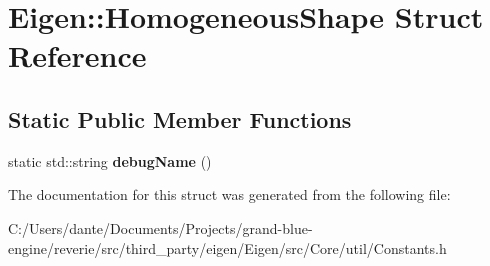 \hypertarget{struct_eigen_1_1_homogeneous_shape}{}\section{Eigen\+::Homogeneous\+Shape Struct Reference}
\label{struct_eigen_1_1_homogeneous_shape}
\subsection*{Static Public Member Functions}
\begin{DoxyCompactItemize}
\item 
\mbox{\label{struct_eigen_1_1_homogeneous_shape_a101440de0501f7b21d2add1e311612a3}} 
static std\+::string {\bfseries debug\+Name} ()
\end{DoxyCompactItemize}


The documentation for this struct was generated from the following file\+:\begin{DoxyCompactItemize}
\item 
C\+:/\+Users/dante/\+Documents/\+Projects/grand-\/blue-\/engine/reverie/src/third\+\_\+party/eigen/\+Eigen/src/\+Core/util/Constants.\+h\end{DoxyCompactItemize}
